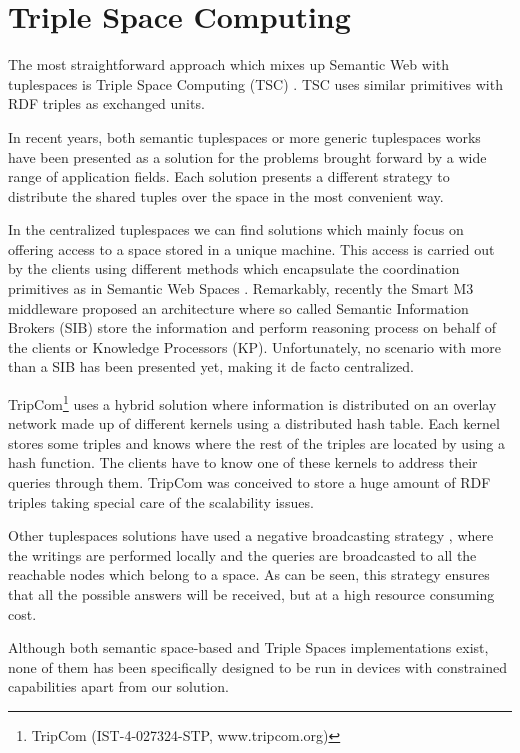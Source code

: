 \section{Triple Space Computing}
\label{sec:tsc_soa}




The most straightforward approach which mixes up Semantic Web with tuplespaces is Triple Space Computing (TSC) \cite{fensel_triple-space_2004}.
TSC uses similar primitives with RDF triples as exchanged units.




In recent years, both semantic tuplespaces or more generic tuplespaces works have been presented as a solution for the
problems brought forward by a wide range of application fields. Each solution presents a different strategy to
distribute the shared tuples over the space in the most convenient way.

In the centralized tuplespaces we can find solutions which mainly focus on offering access to a space stored in a unique
machine. This access is carried out by the clients using different methods which encapsulate the coordination primitives
as in Semantic Web Spaces \cite{nixon_towards_2007}. Remarkably, recently the Smart M3 middleware proposed an
architecture where so called Semantic Information Brokers (SIB) store the information and perform reasoning
process on behalf of the clients or Knowledge Processors (KP). Unfortunately, no scenario with more than a SIB has been
presented yet, making it de facto centralized.

TripCom\footnote{TripCom (IST-4-027324-STP, www.tripcom.org)} uses a hybrid solution where information is distributed on
an overlay network made up of different kernels using a distributed hash table. Each kernel stores some triples and
knows where the rest of the triples are located by using a hash function. The clients have to know one of these
kernels to address their queries through them. TripCom was conceived to store a huge amount of RDF triples taking
special care of the scalability issues.

Other tuplespaces solutions have used a negative broadcasting strategy
\cite{krummenacher_open_2009,murphy_transiently_2006,gomez-goiri_semantic_2011}, where the writings are
performed locally and the queries are broadcasted to all the reachable nodes which belong to a space. As can be seen,
this strategy ensures that all the possible answers will be received, but at a high resource consuming cost.



Although both semantic space-based and Triple Spaces implementations exist, none of them has been specifically designed to be run in devices with constrained capabilities apart from our solution.